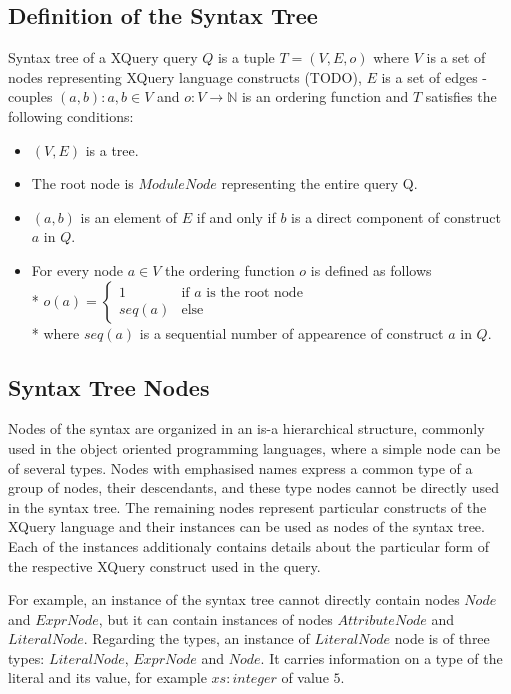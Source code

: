 \subsection{Definition of the Syntax Tree}
\begin{definition}
Syntax tree of a XQuery query $Q$ is a tuple $T = (V, E, o)$ where $V$ is a set of nodes representing XQuery language constructs (TODO), $E$ is a set of edges - couples $(a,b):a,b \in V$ and $o:V \rightarrow \mathbb{N}$ is an ordering function and $T$ satisfies the following conditions:
\begin{itemize}
\item $(V,E)$ is a tree.
\item The root node is $ModuleNode$ representing the entire query Q.
\item $(a,b)$ is an element of $E$ if and only if $b$ is a direct component of construct $a$ in $Q$.
\item For every node $a \in V$ the ordering function $o$ is defined as follows \\* $o(a) = \left\{
	\begin{array}{ll}
		1  & \mbox{if }a\mbox{ is the root node} \\
		seq(a) & \mbox{else}
	\end{array}
\right.$ \\* where $seq(a)$ is a sequential number of appearence of construct $a$ in $Q$.
\end{itemize}
\end{definition}

\subsection{Syntax Tree Nodes}
Nodes of the syntax are organized in an is-a hierarchical structure, commonly used in the object oriented programming languages, where a simple node can be of several types. Nodes with emphasised names express a common type of a group of nodes, their descendants, and these type nodes cannot be directly used in the syntax tree. The remaining nodes represent particular constructs of the XQuery language and their instances can be used as nodes of the syntax tree. Each of the instances additionaly contains details about the particular form of the respective XQuery construct used in the query.


For example, an instance of the syntax tree cannot directly contain nodes $Node$ and $ExprNode$, but it can contain instances of nodes $AttributeNode$ and $LiteralNode$. Regarding the types, an instance of $LiteralNode$ node is of three types: $LiteralNode$, $ExprNode$ and $Node$. It carries information on a type of the literal and its value, for example $xs:integer$ of value $5$. 

